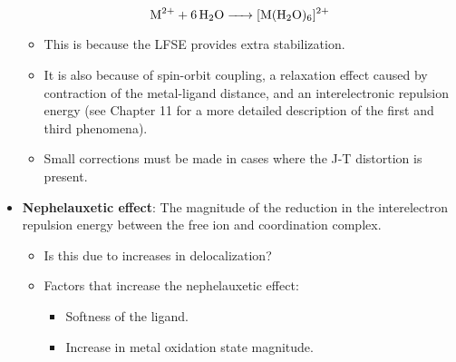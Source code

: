 \documentclass[../notes.tex]{subfiles}
\begin{document}
\begin{itemize}
    \begin{equation*}
        \ce{M^2+ + 6H2O -> [M(H2O)6]^2+}
    \end{equation*}
    \begin{itemize}
        \item This is because the LFSE provides extra stabilization.
        \item It is also because of spin-orbit coupling, a relaxation effect caused by contraction of the metal-ligand distance, and an interelectronic repulsion energy (see Chapter 11 for a more detailed description of the first and third phenomena).
        \item Small corrections must be made in cases where the J-T distortion is present.
    \end{itemize}
    \item \textbf{Nephelauxetic effect}: The magnitude of the reduction in the interelectron repulsion energy between the free ion and coordination complex.
    \begin{itemize}
        \item Is this due to increases in delocalization?
        \item Factors that increase the nephelauxetic effect:
        \begin{itemize}
            \item Softness of the ligand.
            \item Increase in metal oxidation state magnitude.
        \end{itemize}
    \end{itemize}
\end{itemize}
\end{document}
